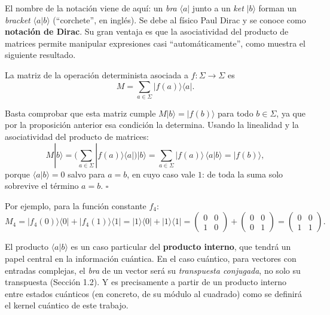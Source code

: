 \documentclass[11pt, a4paper, twoside, openright]{report}
\begin{document}
\noindent El nombre de la notación viene de aquí: un \textit{bra} $\langle a|$ junto a un \textit{ket} $|b\rangle$ forman un \textit{bracket} $\langle a|b\rangle$ (``corchete'', en inglés). Se debe al físico Paul Dirac y se conoce como \textbf{notación de Dirac}. Su gran ventaja es que la asociatividad del producto de matrices permite manipular expresiones casi ``automáticamente'', como muestra el siguiente resultado.

\begin{tcolorbox}[colback=teal!5!white,colframe=teal!75!black,title=\textbf{Proposición: Operaciones deterministas en notación de Dirac}]
La matriz de la operación determinista asociada a $f : \Sigma \to \Sigma$ es
\[ M = \sum_{a \in \Sigma} |f(a)\rangle\langle a|. \]
\end{tcolorbox}

\begin{tcolorbox}[colback=gray!5!white,colframe=gray!75!black,title=\textbf{Demostración}]
Basta comprobar que esta matriz cumple $M|b\rangle = |f(b)\rangle$ para todo $b \in \Sigma$, ya que por la proposición anterior esa condición la determina. Usando la linealidad y la asociatividad del producto de matrices:
\[
M|b\rangle = \Big( \sum_{a \in \Sigma} |f(a)\rangle\langle a| \Big) |b\rangle = \sum_{a \in \Sigma} |f(a)\rangle \, \langle a|b\rangle = |f(b)\rangle,
\]
porque $\langle a|b\rangle = 0$ salvo para $a = b$, en cuyo caso vale $1$: de toda la suma solo sobrevive el término $a = b$. \hfill $\square$
\end{tcolorbox}

\noindent Por ejemplo, para la función constante $f_4$:
\[
M_4 = |f_4(0)\rangle\langle 0| + |f_4(1)\rangle\langle 1| = |1\rangle\langle 0| + |1\rangle\langle 1|
= \begin{pmatrix} 0 & 0 \\ 1 & 0 \end{pmatrix} + \begin{pmatrix} 0 & 0 \\ 0 & 1 \end{pmatrix}
= \begin{pmatrix} 0 & 0 \\ 1 & 1 \end{pmatrix}.
\]

\noindent El producto $\langle a|b\rangle$ es un caso particular del \textbf{producto interno}, que tendrá un papel central en la información cuántica. En el caso cuántico, para vectores con entradas complejas, el \textit{bra} de un vector será su \textit{transpuesta conjugada}, no solo su transpuesta (Sección 1.2). Y es precisamente a partir de un producto interno entre estados cuánticos (en concreto, de su módulo al cuadrado) como se definirá el kernel cuántico de este trabajo.
\end{document}
